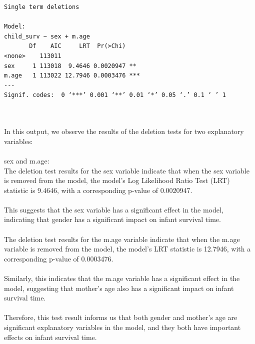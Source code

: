\documentclass[12pt,letterpaper]{article}
\begin{document}

\begin{verbatim}
Single term deletions

Model:
child_surv ~ sex + m.age
       Df    AIC     LRT  Pr(>Chi)    
<none>    113011                      
sex     1 113018  9.4646 0.0020947 ** 
m.age   1 113022 12.7946 0.0003476 ***
---
Signif. codes:  0 ‘***’ 0.001 ‘**’ 0.01 ‘*’ 0.05 ‘.’ 0.1 ‘ ’ 1
\end{verbatim}
\\\\
In this output, we observe the results of the deletion tests for two explanatory variables: \\\\
sex and m.age:\\
The deletion test results for the sex variable indicate that when the sex variable is removed from the model, 
the model's Log Likelihood Ratio Test (LRT) statistic is 9.4646, with a corresponding p-value of 0.0020947.\\\\ 
This suggests that the sex variable has a significant effect in the model, indicating that gender has a significant impact on infant survival time.\\\\
The deletion test results for the m.age variable indicate that when the m.age variable is removed from the model, the model's LRT statistic is 12.7946, with a corresponding p-value of 0.0003476.\\\\ 
Similarly, this indicates that the m.age variable has a significant effect in the model, suggesting that mother's age also has a significant impact on infant survival time.\\\\
Therefore, this test result informs us that both gender and mother's age are significant explanatory variables in the model, and they both have important effects on infant survival time.


\end{document}
